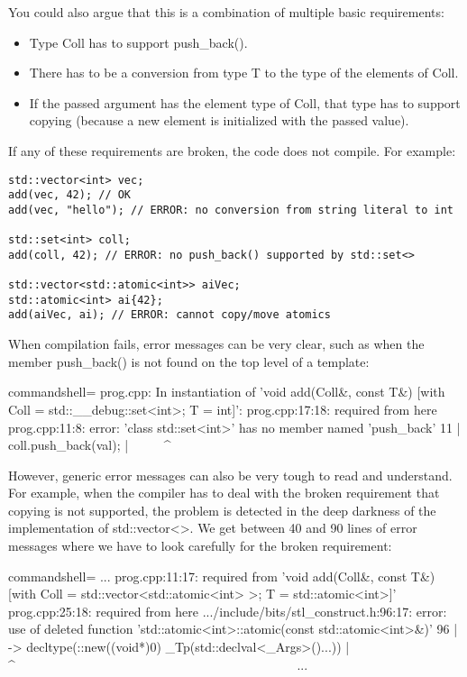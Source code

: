 You could also argue that this is a combination of multiple basic requirements:

\begin{itemize}
\item
Type Coll has to support push\_back().

\item
There has to be a conversion from type T to the type of the elements of Coll.

\item
If the passed argument has the element type of Coll, that type has to support copying (because a new element is initialized with the passed value).
\end{itemize}

If any of these requirements are broken, the code does not compile. For example:


\begin{lstlisting}[style=styleCXX]
std::vector<int> vec;
add(vec, 42); // OK
add(vec, "hello"); // ERROR: no conversion from string literal to int

std::set<int> coll;
add(coll, 42); // ERROR: no push_back() supported by std::set<>

std::vector<std::atomic<int>> aiVec;
std::atomic<int> ai{42};
add(aiVec, ai); // ERROR: cannot copy/move atomics
\end{lstlisting}


When compilation fails, error messages can be very clear, such as when the member push\_back() is not found on the top level of a template:

{\footnotesize
\begin{tcblisting}{commandshell={}}
prog.cpp: In instantiation of ’void add(Coll&, const T&)
             [with Coll = std::__debug::set<int>; T = int]’:
prog.cpp:17:18:     required from here
prog.cpp:11:8: error: ’class std::set<int>’ has no member named ’push_back’
  11 | coll.push_back(val);
      | ~~~~~^~~~~~~~~
\end{tcblisting}
}

However, generic error messages can also be very tough to read and understand. For example, when the compiler has to deal with the broken requirement that copying is not supported, the problem is detected in the deep darkness of the implementation of std::vector<>. We get between 40 and 90 lines of error messages where we have to look carefully for the broken requirement:

{\footnotesize
\begin{tcblisting}{commandshell={}}
...
prog.cpp:11:17: required from ’void add(Coll&, const T&)
                    [with Coll = std::vector<std::atomic<int> >; T = std::atomic<int>]’
prog.cpp:25:18:     required from here
.../include/bits/stl_construct.h:96:17:
    error: use of deleted function
’std::atomic<int>::atomic(const std::atomic<int>&)’
    96 | -> decltype(::new((void*)0) _Tp(std::declval<_Args>()...))
        |                  ^~~~~~~~~~~~~~~~~~~~~~~~~~~~~~~~~~~~~~~~~~~~~
...
\end{tcblisting}
}


